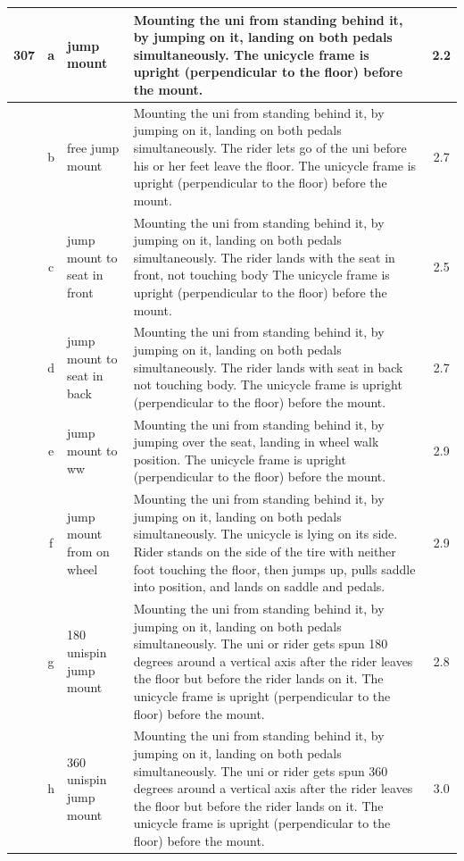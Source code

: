 \begin{longtable}{|r|c|p{4cm}|p{8cm}|c|}
\hline
307 & a & jump mount  & Mounting the uni from standing behind it, by jumping on it, landing on both pedals simultaneously. The unicycle frame is upright (perpendicular to the floor) before the mount. & 2.2 \\ 
\hline
  & b & free jump mount & Mounting the uni from standing behind it, by jumping on it, landing on both pedals simultaneously. The rider lets go of the uni before his or her feet leave the floor. The unicycle frame is upright (perpendicular to the floor) before the mount.  & 2.7 \\ 
\hline
  & c & jump mount to seat in front & Mounting the uni from standing behind it, by jumping on it, landing on both pedals simultaneously. The rider lands with the seat in front, not touching body The unicycle frame is upright (perpendicular to the floor) before the mount. & 2.5 \\ 
\hline
  & d & jump mount to seat in back  & Mounting the uni from standing behind it, by jumping on it, landing on both pedals simultaneously. The rider lands with seat in back not touching body. The unicycle frame is upright (perpendicular to the floor) before the mount.  & 2.7 \\ 
\hline
  & e & jump mount to ww  & Mounting the uni from standing behind it, by jumping over the seat, landing in wheel walk position. The unicycle frame is upright (perpendicular to the floor) before the mount.  & 2.9 \\ 
\hline
  & f & jump mount from on wheel  & Mounting the uni from standing behind it, by jumping on it, landing on both pedals simultaneously. The unicycle is lying on its side. Rider stands on the side of the tire with neither foot touching the floor, then jumps up, pulls saddle into position, and lands on saddle and pedals. & 2.9 \\ 
\hline
  & g & 180 unispin jump mount  & Mounting the uni from standing behind it, by jumping on it, landing on both pedals simultaneously. The uni or rider gets spun 180 degrees around a vertical axis after the rider leaves the floor but before the rider lands on it. The unicycle frame is upright (perpendicular to the floor) before the mount.  & 2.8 \\ 
\hline
  & h & 360 unispin jump mount  & Mounting the uni from standing behind it, by jumping on it, landing on both pedals simultaneously. The uni or rider gets spun 360 degrees around a vertical axis after the rider leaves the floor but before the rider lands on it. The unicycle frame is upright (perpendicular to the floor) before the mount.  & 3.0 \\ 

\end{longtable}
